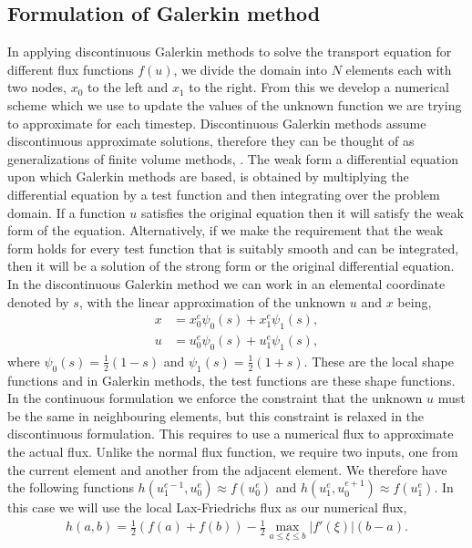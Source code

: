 \documentclass[a4paper, 12pt]{article}
\begin{document}
\subsection{Formulation of Galerkin method}
 
In applying discontinuous Galerkin methods to solve the transport equation for different flux functions $f(u)$, we divide the domain into $N$ elements each with two nodes, $x_0$ to the left and $x_1$ to the right. From this we develop a numerical scheme which we use to update the values of the unknown function we are trying to approximate for each timestep. Discontinuous Galerkin methods assume discontinuous approximate solutions, therefore they can be thought of as generalizations of finite volume methods, \cite{Cockburn2000}. The weak form a differential equation upon which Galerkin methods are based, is obtained by multiplying the differential equation by a test function and then integrating over the problem domain. If a function $u$ satisfies the original equation then it will satisfy the weak form of the equation. Alternatively, if we make the requirement that the weak form holds for every test function that is suitably smooth and can be integrated, then it will be a solution of the strong form or the original differential equation. In the discontinuous Galerkin method we can work in an elemental coordinate denoted by $s$, with the linear approximation of the unknown $u$ and $x$ being,
\begin{align*} 
x &= x^e_0 \psi_0(s) + x^e_1 \psi_1(s),\\
u &= u^e_0 \psi_0(s) + u^e_1 \psi_1(s),
\end{align*}
where $\psi_0(s)=\frac{1}{2}(1-s)$ and $\psi_1(s)=\frac{1}{2}(1+s)$. These are the local shape functions and in Galerkin methods, the test functions are these shape functions. In the continuous formulation we enforce the constraint that the unknown $u$ must be the same in neighbouring elements, but this constraint is relaxed in the discontinuous formulation. This requires to use a numerical flux to approximate the actual flux. Unlike the normal flux function, we require two inputs, one from the current element and another from the adjacent element. We therefore have the following functions $h(u^{e-1}_1,u^e_0) \approx f(u^e_0) $ and $h(u^{e}_1,u^{e+1}_0) \approx f(u^e_1)$. In this case we will use the local Lax-Friedrichs flux as our numerical flux,
\begin{align*}
h(a,b) = \frac{1}{2}(f(a)+f(b)) - \frac{1}{2}\max_{a\leq \xi \leq b}|f'(\xi)|(b-a).
\end{align*}  
\end{document}
